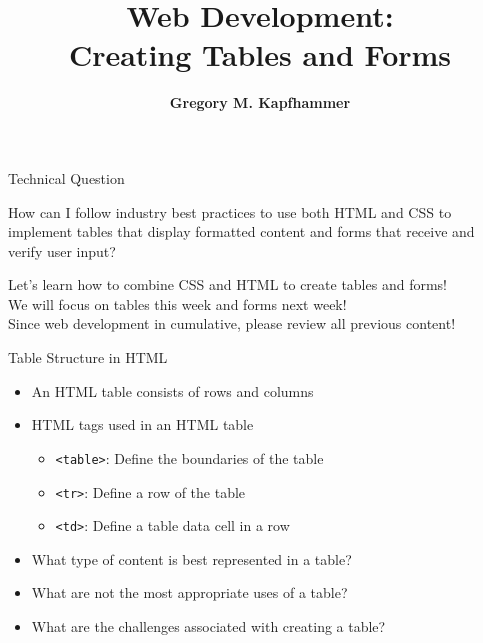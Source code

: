 \documentclass[14pt,aspectratio=169]{beamer}
\title{Web Development: \\ Creating Tables and Forms}
\author{{\bf Gregory M. Kapfhammer}}
\institute[shortinst]{{\bf Department of Computer Science, Allegheny College}}
\begin{document}
{
  \begin{frame}
    \titlepage
  \end{frame}
}

%
\begin{frame}{Technical Question}
  \hspace*{.25in}
  \vspace*{.1in}
  \begin{minipage}{4.5in}
  \begin{center}
    {\large How can I follow industry best practices to use both HTML and CSS to
    implement tables that display formatted content and forms that receive and
  verify user input?}
  \end{center}
  \end{minipage}
  \vspace{2ex}
  \begin{center}
    \small Let's learn how to combine CSS and HTML to create tables and forms!\\
    \small We will focus on tables this week and forms next week!\\
    \small Since web development in cumulative, please review all previous content!\\
  \end{center}
\end{frame}

%
\begin{frame}{Table Structure in HTML}
  \begin{itemize}
    \item An HTML table consists of rows and columns
      \vspace*{-.1in}
    \item HTML tags used in an HTML table
      \begin{itemize}
        \item {\tt <table>}: Define the boundaries of the table
        \item {\tt <tr>}: Define a row of the table
        \item {\tt <td>}: Define a table data cell in a row
      \end{itemize}
      \vspace*{-.2in}
    \item What type of content is best represented in a table?
      \vspace*{-.2in}
    \item What are not the most appropriate uses of a table?
      \vspace*{-.2in}
    \item What are the challenges associated with creating a table?
  \end{itemize}
\end{frame}
\end{document}
